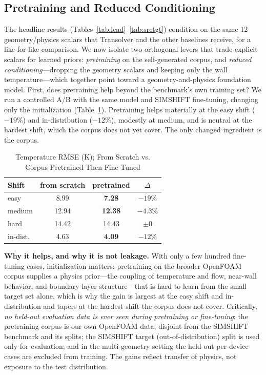 \documentclass[conference]{IEEEtran}
\begin{document}
\subsection{Pretraining and Reduced Conditioning}\label{sec:pretrain}
The headline results (Tables~\ref{tab:lead}--\ref{tab:srctgt}) condition on the same 12
geometry/physics scalars that Transolver and the other baselines receive, for a like-for-like comparison.
We now isolate two orthogonal levers that trade explicit scalars for learned priors: \emph{pretraining} on
the self-generated corpus, and \emph{reduced conditioning}---dropping the geometry scalars and keeping only
the wall temperature---which together point toward a geometry-and-physics foundation model. First, does
pretraining help beyond the benchmark's own training set? We run a controlled A/B with the same model and SIMSHIFT
fine-tuning, changing only the initialization (Table~\ref{tab:vod}). Pretraining helps materially at the
easy shift ($-19\%$) and in-distribution ($-12\%$), modestly at medium, and is neutral at the hardest
shift, which the corpus does not yet cover. The only changed ingredient is the corpus.

\begin{table}[t]\renewcommand{\arraystretch}{1.2}
\caption{Temperature RMSE (K); From Scratch vs. Corpus-Pretrained Then Fine-Tuned}
\label{tab:vod}\centering
\begin{tabular}{@{}lccc@{}}\toprule
Shift & from scratch & pretrained & $\Delta$ \\ \midrule
easy & 8.99 & \textbf{7.28} & $-19\%$ \\
medium & 12.94 & \textbf{12.38} & $-4.3\%$ \\
hard & 14.42 & 14.43 & $\pm 0$ \\
in-dist. & 4.63 & \textbf{4.09} & $-12\%$ \\ \bottomrule
\end{tabular}
\end{table}

\textbf{Why it helps, and why it is not leakage.} With only a few hundred fine-tuning cases,
initialization matters: pretraining on the broader OpenFOAM corpus supplies a physics prior---the
coupling of temperature and flow, near-wall behavior, and boundary-layer structure---that is hard to
learn from the small target set alone, which is why the gain is largest at the easy shift and
in-distribution and tapers at the hardest shift the corpus does not cover. Critically, \emph{no
held-out evaluation data is ever seen during pretraining or fine-tuning}: the pretraining corpus is our
own OpenFOAM data, disjoint from the SIMSHIFT benchmark and its splits; the SIMSHIFT target
(out-of-distribution) split is used only for evaluation; and in the multi-geometry setting the held-out
per-device cases are excluded from training. The gains reflect transfer of physics, not exposure to
the test distribution.
\end{document}
